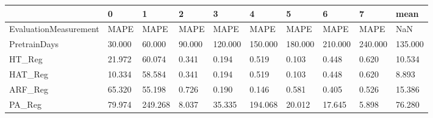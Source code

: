 \begin{tabular}{llllllllll}
\toprule
{} &      0 &       1 &      2 &       3 &       4 &       5 &       6 &       7 &    mean \\
\midrule
EvaluationMeasurement &   MAPE &    MAPE &   MAPE &    MAPE &    MAPE &    MAPE &    MAPE &    MAPE &     NaN \\
PretrainDays          & 30.000 &  60.000 & 90.000 & 120.000 & 150.000 & 180.000 & 210.000 & 240.000 & 135.000 \\
HT\_Reg                & 21.972 &  60.074 &  0.341 &   0.194 &   0.519 &   0.103 &   0.448 &   0.620 &  10.534 \\
HAT\_Reg               & 10.334 &  58.584 &  0.341 &   0.194 &   0.519 &   0.103 &   0.448 &   0.620 &   8.893 \\
ARF\_Reg               & 65.320 &  55.198 &  0.726 &   0.190 &   0.146 &   0.581 &   0.405 &   0.526 &  15.386 \\
PA\_Reg                & 79.974 & 249.268 &  8.037 &  35.335 & 194.068 &  20.012 &  17.645 &   5.898 &  76.280 \\
\bottomrule
\end{tabular}
